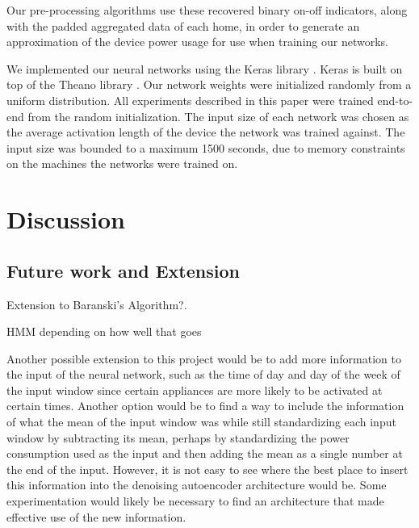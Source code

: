 \documentclass{article}
\begin{document}
Our pre-processing algorithms use these recovered binary on-off indicators, along with the padded aggregated data of each home, in order to generate an approximation of the device power usage for use when training our networks.

We implemented our neural networks using the Keras library \cite{Keras}.
Keras is built on top of the Theano library \cite{Theano}\cite{Theano2}.
Our network weights were initialized randomly from a uniform distribution.
All experiments described in this paper were trained end-to-end from the random initialization.
The input size of each network was chosen as the average activation length of the device the network was trained against.
The input size was bounded to a maximum 1500 seconds, due to memory constraints on the machines the networks were trained on.

\section{Discussion}

\subsection{Future work and Extension}

Extension to Baranski's Algorithm?.

HMM depending on how well that goes

Another possible extension to this project would be to add more information to the input of the neural network, such as the time of day and day of the week of the input window since certain appliances are more likely to be activated at certain times. Another option would be to find a way to include the information of what the mean of the input window was while still standardizing each input window by subtracting its mean\cite{Kelly}, perhaps by standardizing the power consumption used as the input and then adding the mean as a single number at the end of the input. However, it is not easy to see where the best place to insert this information into the denoising autoencoder architecture would be. Some experimentation would likely be necessary to find an architecture that made effective use of the new information.




\end{document}
